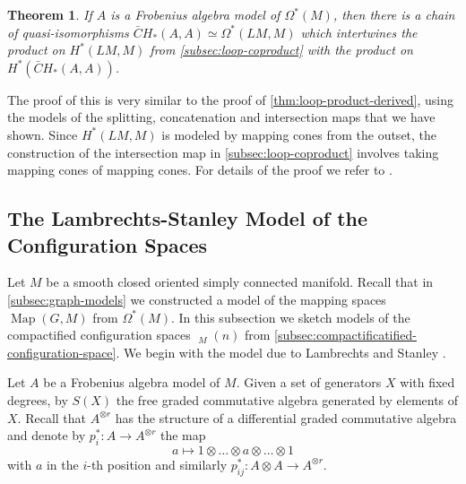 \documentclass{scrartcl}
\theoremstyle{plain}
\newtheorem{theorem}{Theorem}[section]
\theoremstyle{definition}
\newcommand{\quiso}{\simeq}
\DeclareMathOperator{\Map}{Map}
\DeclareMathOperator{\cConf}{\overline{Conf}}
\begin{document}
\begin{theorem}{\cite[Thm. 1.3]{naef2019string}}
    If $A$ is a Frobenius algebra model of $\Omega^*(M)$, then there is a chain of quasi-isomorphisms $\bar CH_*(A, A)\quiso \Omega^*(LM, M)$ which intertwines the product on $H^*(LM, M)$ from \cref{subsec:loop-coproduct} with the product on $H^*(\bar CH_*(A, A))$.
\end{theorem}
The proof of this is very similar to the proof of \cref{thm:loop-product-derived}, using the models of the splitting, concatenation and intersection maps that we have shown. Since $H^*(LM, M)$ is modeled by mapping cones from the outset, the construction of the intersection map in \cref{subsec:loop-coproduct} involves taking mapping cones of mapping cones. For details of the proof we refer to \cite[Sec. 6]{naef2019string}.

\subsection{The Lambrechts-Stanley Model of the Configuration Spaces}\label{subsec:cfg-models}
Let $M$ be a smooth closed oriented simply connected manifold. Recall that in \cref{subsec:graph-models} we constructed a model of the mapping spaces $\Map(G, M)$ from $\Omega^*(M)$. In this subsection we sketch models of the compactified configuration spaces $\cConf_M(n)$ from \cref{subsec:compactificatified-configuration-space}. We begin with the model due to Lambrechts and Stanley \cite{lambrechts2008remarkable}. 

Let $A$ be a Frobenius algebra model of $M$. Given a set of generators $X$ with fixed degrees, by $S(X)$ the free graded commutative algebra generated by elements of $X$. Recall that $A^{\otimes r}$ has the structure of a differential graded commutative algebra and denote by $p_{i}^* \colon A \to A^{\otimes r}$ the map $$a\mapsto 1\otimes\dots\otimes a\otimes \dots\otimes 1$$ with $a$ in the $i$-th position and similarly $p_{ij}^*\colon A\otimes A\to A^{\otimes r}$.
\end{document}
